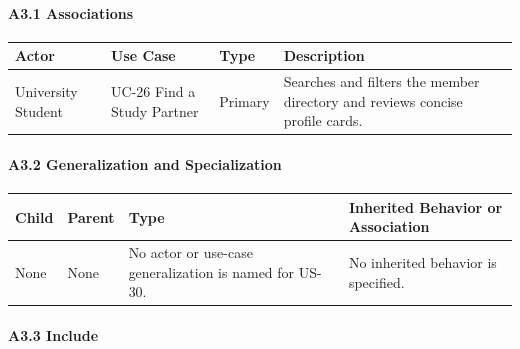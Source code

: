 \documentclass[12pt]{article}
\renewcommand{\baselinestretch}{1.5}
\begin{document}
\hypertarget{sec:a3-1-associations}{}
\paragraph*{A3.1 Associations}
\par\medskip

\begingroup
\small
\renewcommand{\baselinestretch}{1.0}\selectfont
\renewcommand{\arraystretch}{1.15}
\setlength{\tabcolsep}{6pt}
\begin{longtable}{|>{\raggedright\arraybackslash}p{}|>{\raggedright\arraybackslash}p{}|>{\raggedright\arraybackslash}p{}|>{\raggedright\arraybackslash}p{}|}
\hline
\textbf{Actor} & \textbf{Use Case} & \textbf{Type} & \textbf{Description} \\ \hline
\endhead
University Student & UC-26 Find a Study Partner & Primary & Searches and filters the member directory and reviews concise profile cards. \\ \hline
\end{longtable}
\endgroup
\par\medskip

\hypertarget{sec:a3-2-generalization-and-specialization}{}
\paragraph*{A3.2 Generalization and Specialization}
\par\medskip

\begingroup
\small
\renewcommand{\baselinestretch}{1.0}\selectfont
\renewcommand{\arraystretch}{1.15}
\setlength{\tabcolsep}{6pt}
\begin{longtable}{|>{\raggedright\arraybackslash}p{}|>{\raggedright\arraybackslash}p{}|>{\raggedright\arraybackslash}p{}|>{\raggedright\arraybackslash}p{}|}
\hline
\textbf{Child} & \textbf{Parent} & \textbf{Type} & \textbf{Inherited Behavior or Association} \\ \hline
\endhead
None & None & No actor or use-case generalization is named for US-30. & No inherited behavior is specified. \\ \hline
\end{longtable}
\endgroup
\par\medskip

\hypertarget{sec:a3-3-include}{}
\paragraph*{A3.3 Include}
\par\medskip
\end{document}
